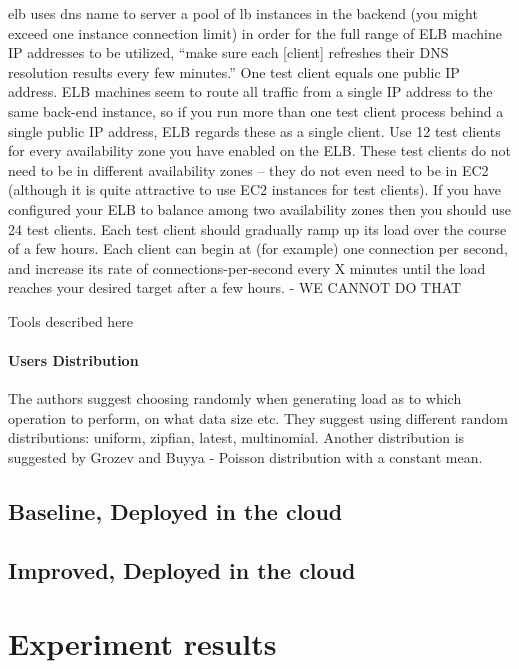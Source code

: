 \documentclass{uvamscse}
\begin{document}
elb uses dns name to server a pool of lb instances in the backend (you might exceed one instance connection limit)
in order for the full range of ELB machine IP addresses to be utilized, “make sure each [client] refreshes their DNS resolution results every few minutes.”
One test client equals one public IP address. ELB machines seem to route all traffic from a single IP address to the same back-end instance, so if you run more than one test client process behind a single public IP address, ELB regards these as a single client.
Use 12 test clients for every availability zone you have enabled on the ELB. These test clients do not need to be in different availability zones – they do not even need to be in EC2 (although it is quite attractive to use EC2 instances for test clients). If you have configured your ELB to balance among two availability zones then you should use 24 test clients.
Each test client should gradually ramp up its load over the course of a few hours. Each client can begin at (for example) one connection per second, and increase its rate of connections-per-second every X minutes until the load reaches your desired target after a few hours. - WE CANNOT DO THAT

Tools described here \cite{Load Testing Framework}

\subsubsection{Users Distribution}
The authors suggest choosing randomly when generating load as to which operation to perform, on what data size etc. They suggest using different random distributions: uniform, zipfian, latest, multinomial\cite{Ycsb}. Another distribution is suggested by Grozev and Buyya \cite{GroBuy} - Poisson distribution with a constant mean.

\section{Baseline, Deployed in the cloud}

\section{Improved, Deployed in the cloud}

\chapter{Experiment results}
\end{document}
